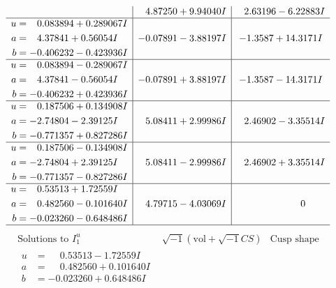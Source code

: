 \documentclass[1p]{elsarticle_modified}
\theoremstyle{definition}
\newcommand{\I}{\sqrt{-1}}
\begin{document}
$$\begin{array}{c|c|c}
 & \phantom{-}4.87250 + 9.94040 I & \phantom{-}2.63196 - 6.22883 I \\ \hline\begin{aligned}
u &= \phantom{-}0.083894 + 0.289067 I \\
a &= \phantom{-}4.37841 + 0.56054 I \\
b &= -0.406232 - 0.423936 I\end{aligned}
 & -0.07891 - 3.88197 I & -1.3587 + 14.3171 I \\ \hline\begin{aligned}
u &= \phantom{-}0.083894 - 0.289067 I \\
a &= \phantom{-}4.37841 - 0.56054 I \\
b &= -0.406232 + 0.423936 I\end{aligned}
 & -0.07891 + 3.88197 I & -1.3587 - 14.3171 I \\ \hline\begin{aligned}
u &= \phantom{-}0.187506 + 0.134908 I \\
a &= -2.74804 - 2.39125 I \\
b &= -0.771357 + 0.827286 I\end{aligned}
 & \phantom{-}5.08411 + 2.99986 I & \phantom{-}2.46902 - 3.35514 I \\ \hline\begin{aligned}
u &= \phantom{-}0.187506 - 0.134908 I \\
a &= -2.74804 + 2.39125 I \\
b &= -0.771357 - 0.827286 I\end{aligned}
 & \phantom{-}5.08411 - 2.99986 I & \phantom{-}2.46902 + 3.35514 I \\ \hline\begin{aligned}
u &= \phantom{-}0.53513 + 1.72559 I \\
a &= \phantom{-}0.482560 - 0.101640 I \\
b &= -0.023260 - 0.648486 I\end{aligned}
 & \phantom{-}4.79715 - 4.03069 I & \phantom{-0.000000 } 0\\
 \hline 
 \end{array}$$\newpage$$\begin{array}{c|c|c}  
\text{Solutions to }I^u_{1}& \I (\text{vol} + \sqrt{-1}CS) & \text{Cusp shape}\\
 \hline 
\begin{aligned}
u &= \phantom{-}0.53513 - 1.72559 I \\
a &= \phantom{-}0.482560 + 0.101640 I \\
b &= -0.023260 + 0.648486 I\end{aligned}

\end{array}$$
\end{document}
